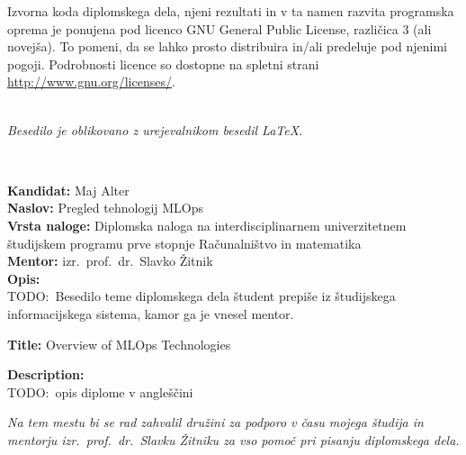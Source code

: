 \vspace*{1cm}
{\small \noindent
  Izvorna koda diplomskega dela, njeni rezultati in v ta namen razvita programska oprema je ponujena pod licenco GNU General Public License,
  različica 3 (ali novejša). To pomeni, da se lahko prosto distribuira in/ali predeluje pod njenimi pogoji.
  Podrobnosti licence so dostopne na spletni strani \url{http://www.gnu.org/licenses/}.
}

\vfill
\begin{center}
  \ \\ \vfill
  {\em
    Besedilo je oblikovano z urejevalnikom besedil \LaTeX.}
\end{center}

\clearemptydoublepage{}

\thispagestyle{empty}
\
\vfill

\bigskip
\noindent\textbf{Kandidat:} Maj Alter\\
\noindent\textbf{Naslov:} Pregled tehnologij MLOps\\
\noindent\textbf{Vrsta naloge:} Diplomska naloga na interdisciplinarnem univerzitetnem študijskem programu prve stopnje Računalništvo in matematika \\
\noindent\textbf{Mentor:} izr.\ prof.\ dr.\ Slavko Žitnik\\

\bigskip
\noindent\textbf{Opis:}\\
TODO:\ Besedilo teme diplomskega dela študent prepiše iz študijskega informacijskega sistema, kamor ga je vnesel mentor.

\bigskip
\noindent\textbf{Title:} Overview of MLOps Technologies

\bigskip
\noindent\textbf{Description:}\\
TODO:\ opis diplome v angleščini

\vfill

\vspace{2cm}

\clearemptydoublepage{}

\thispagestyle{empty}\mbox{}\vfill\null\it%
\noindent
Na tem mestu bi se rad zahvalil družini za podporo v času mojega študija in mentorju izr.\ prof.\ dr.\ Slavku Žitniku za vso pomoč pri pisanju diplomskega dela.
\rm\normalfont{}

\clearemptydoublepage{}


